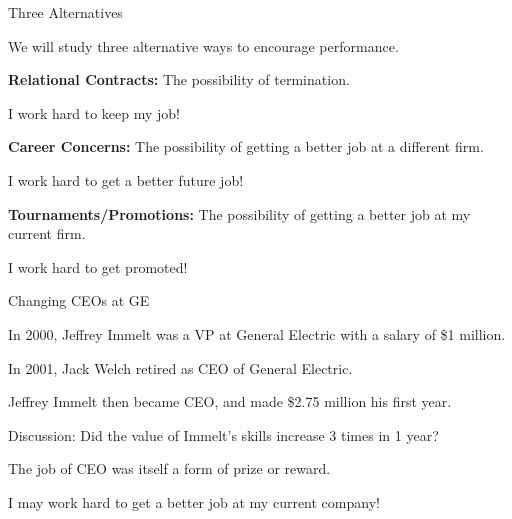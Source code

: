 \documentclass[aspectratio=169,usenames,dvipsnames]{beamer}
\newenvironment{wideitemize}{\itemize\addtolength{\itemsep}{10pt}}{\enditemize}
\begin{document}
\begin{frame}{Three Alternatives}

\begin{wideitemize}
    \item We will study three alternative ways to encourage performance.
    \item \textbf{Relational Contracts:} The possibility of termination.
    \begin{wideitemize}
        \item I work hard to keep my job!
    \end{wideitemize}
    \item \textbf{Career Concerns:} The possibility of getting a better job at a different firm.
    \begin{wideitemize}
        \item I work hard to get a better future job!
    \end{wideitemize}
    \item \textbf{Tournaments/Promotions:} The possibility of getting a better job at my current firm.
    \begin{wideitemize}
        \item I work hard to get promoted!
    \end{wideitemize}
\end{wideitemize}
    
\end{frame}


\begin{frame}{Changing CEOs at GE}

\begin{wideitemize}
    \item In 2000, Jeffrey Immelt was a VP at General Electric with  a salary of \$1 million.
    \item In 2001, Jack Welch retired as CEO of General Electric.
    \item Jeffrey Immelt then became CEO, and made \$2.75 million his first year.
    \item Discussion: Did the value of Immelt's skills increase 3 times in 1 year?\pause
    \item The job of CEO was itself a form of prize or reward.
\end{wideitemize}
    
\end{frame}


\begin{frame}
\centering
    \huge I may work hard to get a better job at my current company!

\end{frame}
\end{document}
